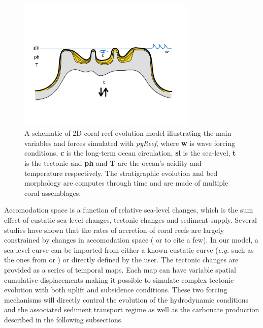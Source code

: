 \documentclass[default,jgrga]{agutex2015}
\begin{document}
\begin{article}
\begin{figure}
\centering
\noindent\includegraphics[width=20pc]{figs/fig1.pdf}
\caption{A schematic of 2D coral reef evolution model illustrating the main variables and forces simulated with \textit{pyReef}, where \textbf{w} is wave forcing conditions, \textbf{c} is the long-term ocean circulation, \textbf{sl} is the sea-level, \textbf{t} is the tectonic and \textbf{ph} and \textbf{T} are the ocean's acidity and temperature respectively. The stratigraphic evolution and bed morphology are computes through time and are made of multiple coral assemblages.
}
\label{pyreef_sketch}
\end{figure}

\noindent Accomodation space is a function of relative sea-level changes, which is the sum effect of eustatic sea-level changes, tectonic changes and sediment supply. Several studies have shown that the rates of accretion of coral reefs are largely constrained by changes in accomodation space (\citet{VanWoesik15} or \citet{Roff15} to cite a few). In our model, a sea-level curve can be imported from either a known eustatic curve (\textit{e.g.} such as the ones from \citet{Haq87} or \citet{Miller05}) or directly defined by the user. The tectonic changes are provided as a series of temporal maps. Each map can have variable spatial cumulative displacements making it possible to simulate complex tectonic evolution with both uplift and subsidence conditions. These two forcing mechanisms will directly control the evolution of the hydrodynamic conditions and the associated sediment transport regime as well as the carbonate production described in the following subsections.


\end{article}
\end{document}
